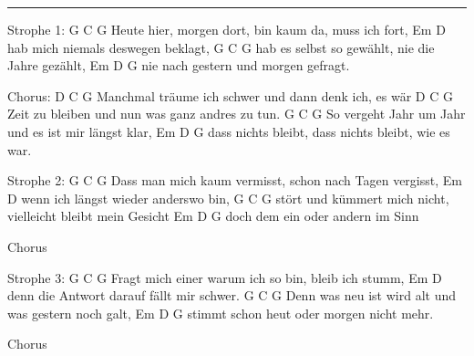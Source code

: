 \noindent\rule{\columnwidth}{1pt}

\begin{lstsong}
Strophe 1:
      G                           C            G
Heute hier, morgen dort, bin kaum da, muss ich fort,
                    Em      D
hab mich niemals deswegen beklagt,
       G                          C       G
hab es selbst so gewählt, nie die Jahre gezählt,
         Em          D        G
nie nach gestern und morgen gefragt.

Chorus:
         D                             C           G
Manchmal träume ich schwer und dann denk ich, es wär
        D                          C       G
Zeit zu bleiben und nun was ganz andres zu tun.
      G                        C              G
So vergeht Jahr um Jahr und es ist mir längst klar,
            Em                  D              G
dass nichts bleibt, dass nichts bleibt, wie es war.

Strophe 2:
         G                                 C       G
Dass man mich kaum vermisst, schon nach Tagen vergisst,
                       Em       D
wenn ich längst wieder anderswo bin,
          G                              C             G
stört und kümmert mich nicht, vielleicht bleibt mein Gesicht
         Em        D        G
doch dem ein oder andern im Sinn

Chorus

Strophe 3:
           G                  C              G
Fragt mich einer warum ich so bin, bleib ich stumm,
                 Em               D
denn die Antwort darauf fällt mir schwer.
         G                        C            G
Denn was neu ist wird alt und was gestern noch galt,
             Em        D            G
stimmt schon heut oder morgen nicht mehr.

Chorus
\end{lstsong}
\newpage


